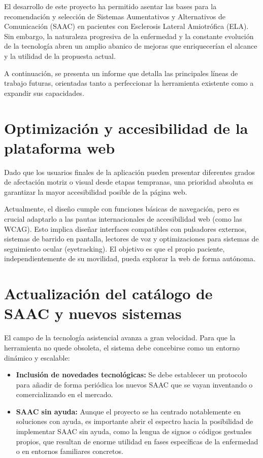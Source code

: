 
El desarrollo de este proyecto ha permitido asentar las bases para la recomendación y selección de Sistemas Aumentativos y Alternativos de Comunicación (SAAC) en pacientes con Esclerosis Lateral Amiotrófica (ELA). Sin embargo, la naturaleza progresiva de la enfermedad \cite{startstemcells:als, hardiman2017amyotrophic} y la constante evolución de la tecnología abren un amplio abanico de mejoras  que enriquecerían el alcance y la utilidad de la propuesta actual.

A continuación, se presenta un informe que detalla las principales líneas de trabajo futuras, orientadas tanto a perfeccionar la herramienta existente como a expandir sus capacidades.

\section{Optimización y accesibilidad de la plataforma web}
Dado que los usuarios finales de la aplicación pueden presentar diferentes grados de afectación motriz o visual desde etapas tempranas, una prioridad absoluta es garantizar la mayor accesibilidad posible de la página web. 

Actualmente, el diseño cumple con funciones básicas de navegación, pero es crucial adaptarlo a las pautas internacionales de accesibilidad web (como las WCAG). Esto implica diseñar interfaces compatibles con pulsadores externos, sistemas de barrido en pantalla, lectores de voz y optimizaciones para sistemas de seguimiento ocular (eyetracking). El objetivo es que el propio paciente, independientemente de su movilidad, pueda explorar la web de forma autónoma.

\section{Actualización del catálogo de SAAC y nuevos sistemas}
El campo de la tecnología asistencial avanza a gran velocidad. Para que la herramienta no quede obsoleta, el sistema debe concebirse como un entorno dinámico y escalable:
\begin{itemize}
    	\item \textbf{Inclusión de novedades tecnológicas:} Se debe establecer un protocolo para añadir de forma periódica los nuevos SAAC que se vayan inventando o comercializando en el mercado.
    	\item \textbf{SAAC sin ayuda:} Aunque el proyecto se ha centrado notablemente en soluciones con ayuda, es importante abrir el espectro hacia la posibilidad de implementar SAAC sin ayuda, como la lengua de signos o códigos gestuales propios, que resultan de enorme utilidad 		en fases específicas de la enfermedad o en entornos familiares concretos.
\end{itemize}

